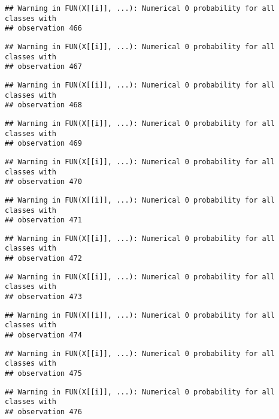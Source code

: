 \documentclass[
]{article}
\begin{document}
\begin{verbatim}
## Warning in FUN(X[[i]], ...): Numerical 0 probability for all classes with
## observation 466
\end{verbatim}

\begin{verbatim}
## Warning in FUN(X[[i]], ...): Numerical 0 probability for all classes with
## observation 467
\end{verbatim}

\begin{verbatim}
## Warning in FUN(X[[i]], ...): Numerical 0 probability for all classes with
## observation 468
\end{verbatim}

\begin{verbatim}
## Warning in FUN(X[[i]], ...): Numerical 0 probability for all classes with
## observation 469
\end{verbatim}

\begin{verbatim}
## Warning in FUN(X[[i]], ...): Numerical 0 probability for all classes with
## observation 470
\end{verbatim}

\begin{verbatim}
## Warning in FUN(X[[i]], ...): Numerical 0 probability for all classes with
## observation 471
\end{verbatim}

\begin{verbatim}
## Warning in FUN(X[[i]], ...): Numerical 0 probability for all classes with
## observation 472
\end{verbatim}

\begin{verbatim}
## Warning in FUN(X[[i]], ...): Numerical 0 probability for all classes with
## observation 473
\end{verbatim}

\begin{verbatim}
## Warning in FUN(X[[i]], ...): Numerical 0 probability for all classes with
## observation 474
\end{verbatim}

\begin{verbatim}
## Warning in FUN(X[[i]], ...): Numerical 0 probability for all classes with
## observation 475
\end{verbatim}

\begin{verbatim}
## Warning in FUN(X[[i]], ...): Numerical 0 probability for all classes with
## observation 476
\end{verbatim}
\end{document}
